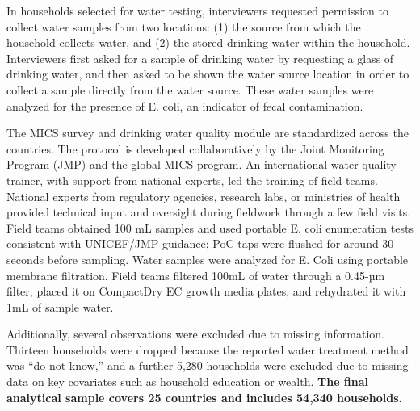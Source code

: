 \documentclass [11pt]{article}
\theoremstyle{plain}
\theoremstyle{definition}
\theoremstyle{remark}
\newcommand{\1}{\bm{1}}
\begin{document}
In households selected for water testing, interviewers requested permission to collect water samples from two locations: (1) the source from which the household collects water, and (2) the stored drinking water within the household. Interviewers first asked for a sample of drinking water by requesting a glass of drinking water, and then asked to be shown the water source location in order to collect a sample directly from the water source. These water samples were analyzed for the presence of E. coli, an indicator of fecal contamination. 

The MICS survey and drinking water quality module are standardized across the countries. The protocol is developed collaboratively by the Joint Monitoring Program (JMP) and the global MICS program. An international water quality trainer, with support from national experts, led the training of field teams. National experts from regulatory agencies, research labs, or ministries of health provided technical input and oversight during fieldwork through a few field visits. Field teams obtained 100 mL samples and used portable E. coli enumeration tests consistent with UNICEF/JMP guidance; PoC taps were flushed for around 30 seconds before sampling. Water samples were analyzed for E. Coli using portable membrane filtration. Field teams filtered 100mL of water through a 0.45-µm filter, placed it on CompactDry EC growth media plates, and rehydrated it with 1mL of sample water.

Additionally, several observations were excluded due to missing information. Thirteen households were dropped because the reported water treatment method was “do not know,” and a further 5,280 households were excluded due to missing data on key covariates such as household education or wealth. \textbf{The final analytical sample covers 25 countries and includes 54,340 households.}

\end{document}
